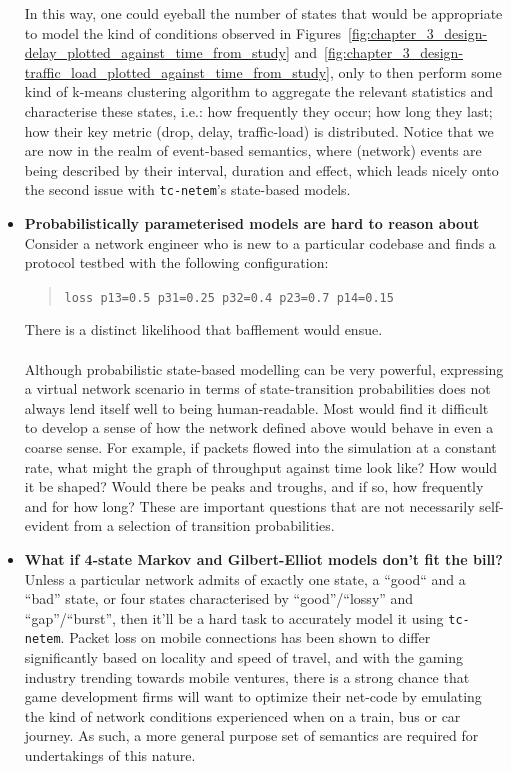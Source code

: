 \begin{itemize}
    In this way, one could eyeball the number of states that would be appropriate to model the kind of conditions
    observed in Figures~\ref{fig:chapter_3_design-delay_plotted_against_time_from_study}
    and~\ref{fig:chapter_3_design-traffic_load_plotted_against_time_from_study}, only to then perform some kind of
    k-means clustering algorithm to aggregate the relevant statistics and characterise these states, i.e.: how
    frequently they occur; how long they last; how their key metric (drop, delay, traffic-load) is distributed.
    Notice that we are now in the realm of event-based semantics, where (network) events are being described by their
    interval, duration and effect, which leads nicely onto the second issue with \texttt{tc-netem}'s state-based
    models.
    \newpage
    \item \textbf{Probabilistically parameterised models are hard to reason about} \\
    Consider a network engineer who is new to a particular codebase and finds a protocol testbed with the following
    configuration:
    \begin{quote}
        \texttt{loss p13=0.5 p31=0.25 p32=0.4 p23=0.7 p14=0.15}
    \end{quote}
    There is a distinct likelihood that bafflement would ensue. \\ \\
    Although probabilistic state-based modelling can be very powerful, expressing a virtual network scenario in terms
    of state-transition probabilities does not always lend itself well to being human-readable. Most would find it
    difficult to develop a sense of how the network defined above would behave in even a coarse sense. For example,
    if packets flowed into the simulation at a constant rate, what might the graph of throughput against time look
    like? How would it be shaped? Would there be peaks and troughs, and if so, how frequently and for how long? These
    are important questions that are not necessarily self-evident from a selection of transition probabilities.
    \item \textbf{What if 4-state Markov and Gilbert-Elliot models don't fit the bill?} \\
    Unless a particular network admits of exactly one state, a ``good`` and a ``bad'' state, or four states
    characterised by ``good''/``lossy'' and ``gap''/``burst'', then it'll be a hard task to accurately model it
    using \texttt{tc-netem}. Packet loss on mobile connections has been shown to differ significantly based on locality
    and speed of travel\cite{mobile_broadband_networks_under_mobility}, and with the gaming industry trending towards
    mobile ventures\cite{statista_mobile_gaming, rise_of_mobile_gaming}, there is a strong chance that game development
    firms will want to optimize their net-code by emulating the kind of network conditions experienced when on a
    train, bus or car journey. As such, a more general purpose set of semantics are required for undertakings of this
    nature.
\end{itemize}

